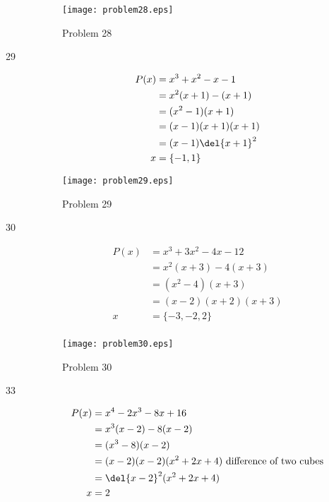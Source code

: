 \documentclass{exam}
\begin{document}
\begin{description}
      \begin{figure}[H]
        \centering
        \texttt{[image: problem28.eps]}
        \caption*{Problem 28}
      \end{figure}

    \pagebreak

    \item[29] 
      \begin{align*}
        P(x) &= x^3 + x^2 - x - 1 \\
             &= x^2(x + 1) - (x + 1) \\
             &= (x^2 - 1)(x + 1) \\
             &= (x - 1)(x + 1)(x + 1) \\
             &= (x - 1)\del{x + 1}^2 \\
        x    &= \{ -1, 1 \} \\
      \end{align*}
      
      \begin{figure}[H]
        \centering
        \texttt{[image: problem29.eps]}
        \caption*{Problem 29}
      \end{figure}

    \pagebreak

    \item[30] 
      \begin{align*}
        P(x) &= x^3 + 3x^2 - 4x - 12 \\
             &= x^2(x + 3) - 4(x + 3) \\
             &= (x^2 - 4)(x + 3) \\
             &= (x - 2)(x + 2)(x + 3) \\
        x    &= \{ -3, -2, 2 \} \\
      \end{align*}
      
      \begin{figure}[H]
        \centering
        \texttt{[image: problem30.eps]}
        \caption*{Problem 30}
      \end{figure}

    \pagebreak

    \item[33] 
      \begin{align*}
        P(x) &= x^4 - 2x^3 - 8x + 16 \\
             &= x^3(x - 2) - 8(x - 2) \\
             &= (x^3 - 8)(x - 2) \\
             &= (x - 2)(x - 2)(x^2 + 2x + 4) \text{ difference of two cubes} \\
             &= \del{x - 2}^2(x^2 + 2x + 4) \\
        x    &= 2 \\
      \end{align*}
      

\end{description}
\end{document}
